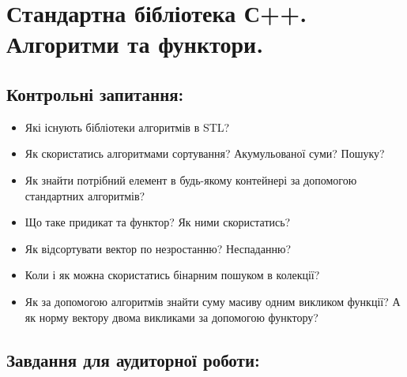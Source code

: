 \documentclass[a5paper,titlepage,openany,twoside,
]
{book_unv}%
\begin{document}
\chapter{Стандартна бібліотека С++. Алгоритми та функтори.}
%

\section{Контрольні запитання:}
\begin{itemize}
\item
  Які існують бібліотеки алгоритмів в STL?
\item
  Як скористатись алгоритмами сортування? Акумульованої суми? Пошуку?
\item
  Як знайти потрібний елемент в будь-якому контейнері за допомогою
  стандартних алгоритмів?
\item
  Що таке придикат та функтор? Як ними скористатись?
\item
  Як відсортувати вектор по незростанню? Неспаданню?
\item
  Коли і як можна скористатись бінарним пошуком в колекції?
\item
  Як за допомогою алгоритмів знайти суму масиву одним викликом функції?
  А як норму вектору двома викликами за допомогою функтору?
\end{itemize}

\section{Завдання для аудиторної роботи:}
\end{document}
